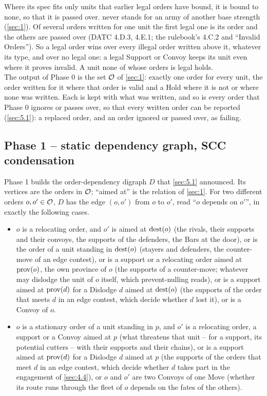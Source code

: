 \documentclass[12pt,a4paper]{article}
\begin{document}
Where its spec fits only units that earlier legal orders have bound, it is bound to none, so that it is passed over.
 never stands for an army of another base strength (\cref{sec:1}).
Of several orders written for one unit the first legal one is its order and the others are passed over (DATC 4.D.3, 4.E.1; the rulebook's 4.C.2 and ``Invalid Orders'').
So a legal order wins over every illegal order written above it, whatever its type, and over no legal one: a legal Support or Convoy keeps its unit even where it proves invalid.
A unit none of whose orders is legal holds.\\
The output of Phase 0 is the set $\mathcal{O}$ of \cref{sec:1}: exactly one order for every unit, the order written for it where that order is valid and a Hold where it is not or where none was written.
Each is kept with what was written, and so is every order that Phase 0 ignores or passes over, so that every written order can be reported (\cref{sec:5.1}): a replaced order, and an order ignored or passed over, as failing.

\subsection*{Phase 1 -- static dependency graph, SCC condensation}\label{sec:6.phase1}

Phase 1 builds the order-dependency digraph $D$ that \cref{sec:5.1} announced.
Its vertices are the orders in $\mathcal{O}$; ``aimed at'' is the relation of \cref{sec:1}.
For two different orders $o, o' \in \mathcal{O}$, $D$ has the edge $(o, o')$ from $o$ to $o'$, read ``$o$ depends on $o'$'', in exactly the following cases.
\begin{itemize}
\item $o$ is a relocating order, and $o'$ is aimed at $\operatorname{dest}(o)$ (the rivals, their supports and their convoys, the supports of the defenders, the Bars at the door), or is the order of a unit standing in $\operatorname{dest}(o)$ (stayers and defenders, the counter-move of an edge contest), or is a support or a relocating order aimed at $\operatorname{prov}(o)$, the own province of $o$ (the supports of a counter-move; whatever may dislodge the unit of $o$ itself, which prevent-nulling reads), or is a support aimed at $\operatorname{prov}(d)$ for a Dislodge $d$ aimed at $\operatorname{dest}(o)$ (the supports of the order that meets $d$ in an edge contest, which decide whether $d$ lost it), or is a Convoy of $o$.
\item $o$ is a stationary order of a unit standing in $p$, and $o'$ is a relocating order, a support or a Convoy aimed at $p$ (what threatens that unit -- for a support, its potential cutters -- with their supports and their chains), or is a support aimed at $\operatorname{prov}(d)$ for a Dislodge $d$ aimed at $p$ (the supports of the orders that meet $d$ in an edge contest, which decide whether $d$ takes part in the engagement of \cref{sec:4.4}), or $o$ and $o'$ are two Convoys of one Move (whether its route runs through the fleet of $o$ depends on the fates of the others).
\end{itemize}
\end{document}

